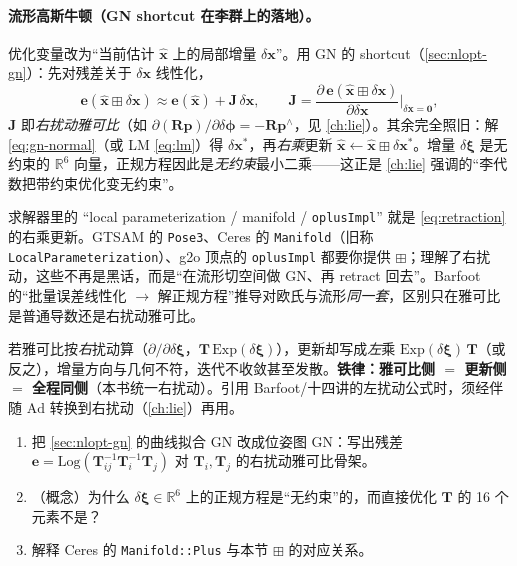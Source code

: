 \paragraph{流形高斯牛顿（GN shortcut 在李群上的落地）。}\cite{barfoot2024state,gaoxiang2019slam14}
优化变量改为“当前估计 $\hat{\mathbf{x}}$ 上的局部增量 $\delta\mathbf{x}$”。用 GN 的 shortcut（\cref{sec:nlopt-gn}）：先对残差关于 $\delta\mathbf{x}$ 线性化，
\begin{equation}
  \mathbf{e}(\hat{\mathbf{x}}\boxplus\delta\mathbf{x})\approx\mathbf{e}(\hat{\mathbf{x}})+\mathbf{J}\,\delta\mathbf{x},\qquad
  \mathbf{J}=\frac{\partial\,\mathbf{e}(\hat{\mathbf{x}}\boxplus\delta\mathbf{x})}{\partial\delta\mathbf{x}}\bigg|_{\delta\mathbf{x}=\mathbf{0}},
  \label{eq:manifold-jac}
\end{equation}
$\mathbf{J}$ 即\emph{右扰动雅可比}（如 $\partial(\mathbf{R}\mathbf{p})/\partial\delta\boldsymbol{\phi}=-\mathbf{R}\mathbf{p}^\wedge$，见 \cref{ch:lie}）。其余完全照旧：解 \cref{eq:gn-normal}（或 LM \cref{eq:lm}）得 $\delta\mathbf{x}^*$，再\emph{右乘}更新 $\hat{\mathbf{x}}\leftarrow\hat{\mathbf{x}}\boxplus\delta\mathbf{x}^*$。增量 $\delta\boldsymbol{\xi}$ 是无约束的 $\mathbb{R}^6$ 向量，正规方程因此是\emph{无约束}最小二乘——这正是 \cref{ch:lie} 强调的“李代数把带约束优化变无约束”。

\begin{insight}
求解器里的 “local parameterization / manifold / \texttt{oplusImpl}” 就是 \cref{eq:retraction} 的右乘更新。GTSAM 的 \texttt{Pose3}、Ceres 的 \texttt{Manifold}（旧称 \texttt{LocalParameterization}）、g2o 顶点的 \texttt{oplusImpl} 都要你提供 $\boxplus$；理解了右扰动，这些不再是黑话，而是“在流形切空间做 GN、再 retract 回去”。Barfoot\cite{barfoot2024state} 的“批量误差线性化 $\to$ 解正规方程”推导对欧氏与流形\emph{同一套}，区别只在雅可比是普通导数还是右扰动雅可比。
\end{insight}

\begin{pitfall}
若雅可比按\emph{右}扰动算（$\partial/\partial\delta\boldsymbol{\xi}$，$\mathbf{T}\,\mathrm{Exp}(\delta\boldsymbol{\xi})$），更新却写成\emph{左}乘 $\mathrm{Exp}(\delta\boldsymbol{\xi})\,\mathbf{T}$（或反之），增量方向与几何不符，迭代不收敛甚至发散。\textbf{铁律：雅可比侧 $=$ 更新侧 $=$ 全程同侧}（本书统一右扰动）。引用 Barfoot/十四讲的左扰动公式时，须经伴随 $\mathrm{Ad}$ 转换到右扰动（\cref{ch:lie}）再用。
\end{pitfall}

\begin{practice}
\begin{enumerate}
  \item 把 \cref{sec:nlopt-gn} 的曲线拟合 GN 改成位姿图 GN：写出残差 $\mathbf{e}=\mathrm{Log}(\mathbf{T}_{ij}^{-1}\mathbf{T}_i^{-1}\mathbf{T}_j)$ 对 $\mathbf{T}_i,\mathbf{T}_j$ 的右扰动雅可比骨架。
  \item （概念）为什么 $\delta\boldsymbol{\xi}\in\mathbb{R}^6$ 上的正规方程是“无约束”的，而直接优化 $\mathbf{T}$ 的 16 个元素不是？
  \item 解释 Ceres 的 \texttt{Manifold::Plus} 与本节 $\boxplus$ 的对应关系。
\end{enumerate}
\end{practice}

